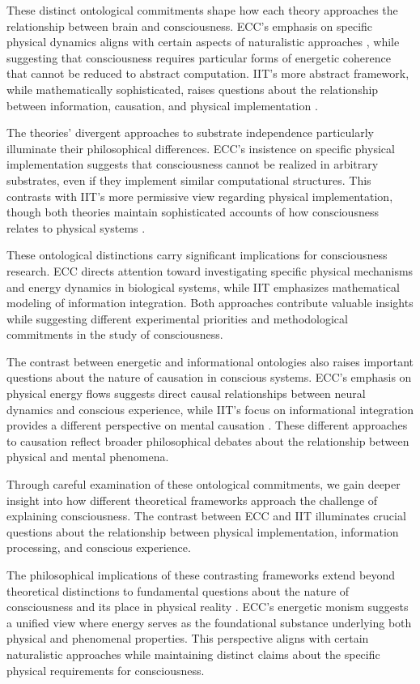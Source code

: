 \begin{refsection}
These distinct ontological commitments shape how each theory approaches the relationship between brain and consciousness. ECC's emphasis on specific physical dynamics aligns with certain aspects of naturalistic approaches \cite{Goff2019}, while suggesting that consciousness requires particular forms of energetic coherence that cannot be reduced to abstract computation. IIT's more abstract framework, while mathematically sophisticated, raises questions about the relationship between information, causation, and physical implementation \cite{Tononi2015}.

The theories' divergent approaches to substrate independence particularly illuminate their philosophical differences. ECC's insistence on specific physical implementation suggests that consciousness cannot be realized in arbitrary substrates, even if they implement similar computational structures. This contrasts with IIT's more permissive view regarding physical implementation, though both theories maintain sophisticated accounts of how consciousness relates to physical systems \cite{Strawson2006}.

These ontological distinctions carry significant implications for consciousness research. ECC directs attention toward investigating specific physical mechanisms and energy dynamics in biological systems, while IIT emphasizes mathematical modeling of information integration. Both approaches contribute valuable insights while suggesting different experimental priorities and methodological commitments in the study of consciousness.

The contrast between energetic and informational ontologies also raises important questions about the nature of causation in conscious systems. ECC's emphasis on physical energy flows suggests direct causal relationships between neural dynamics and conscious experience, while IIT's focus on informational integration provides a different perspective on mental causation \cite{Tononi2008}. These different approaches to causation reflect broader philosophical debates about the relationship between physical and mental phenomena.

Through careful examination of these ontological commitments, we gain deeper insight into how different theoretical frameworks approach the challenge of explaining consciousness. The contrast between ECC and IIT illuminates crucial questions about the relationship between physical implementation, information processing, and conscious experience.

The philosophical implications of these contrasting frameworks extend beyond theoretical distinctions to fundamental questions about the nature of consciousness and its place in physical reality \cite{Skrbina2017}. ECC's energetic monism suggests a unified view where energy serves as the foundational substance underlying both physical and phenomenal properties. This perspective aligns with certain naturalistic approaches while maintaining distinct claims about the specific physical requirements for consciousness.


\end{refsection}
